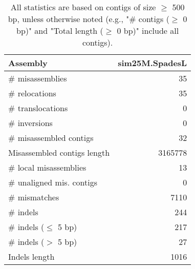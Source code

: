 \documentclass[12pt,a4paper]{article}
\begin{document}
\begin{table}[ht]
\begin{center}
\caption{All statistics are based on contigs of size $\geq$ 500 bp, unless otherwise noted (e.g., "\# contigs ($\geq$ 0 bp)" and "Total length ($\geq$ 0 bp)" include all contigs).}
\begin{tabular}{|l*{1}{|r}|}
\hline
Assembly & sim25M.SpadesL \\ \hline
\# misassemblies & 35 \\ \hline
\hspace{5mm}\# relocations & 35 \\ \hline
\hspace{5mm}\# translocations & 0 \\ \hline
\hspace{5mm}\# inversions & 0 \\ \hline
\# misassembled contigs & 32 \\ \hline
Misassembled contigs length & 3165778 \\ \hline
\# local misassemblies & 13 \\ \hline
\# unaligned mis. contigs & 0 \\ \hline
\# mismatches & 7110 \\ \hline
\# indels & 244 \\ \hline
\hspace{5mm}\# indels ($\leq$ 5 bp) & 217 \\ \hline
\hspace{5mm}\# indels ($>$ 5 bp) & 27 \\ \hline
Indels length & 1016 \\ \hline
\end{tabular}
\end{center}
\end{table}
\end{document}
